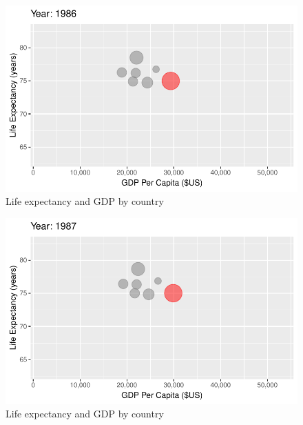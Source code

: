 \documentclass[
  letterpaper,
  DIV=11,
  numbers=noendperiod]{scrreport}
\theoremstyle{definition}
\theoremstyle{remark}
\begin{document}
\begin{figure}

{\centering \includegraphics{index_files/figure-pdf/fig-anim-country-63.pdf}

}

\caption{\label{fig-anim-country-63}Life expectancy and GDP by country}

\end{figure}

\begin{figure}

{\centering \includegraphics{index_files/figure-pdf/fig-anim-country-64.pdf}

}

\caption{\label{fig-anim-country-64}Life expectancy and GDP by country}

\end{figure}
\end{document}
